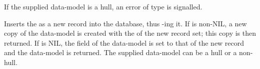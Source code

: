 \noindent If the supplied data-model is a hull, an error of type  is signalled.

Inserts the  as a new record into the database, thus -ing it. If  is non-NIL, a new copy of the data-model is created with the  of the new record set; this copy is then returned. If  is NIL, the  field of the data-model is set to that of the new record and the data-model is returned. The supplied data-model can be a hull or a non-hull.
